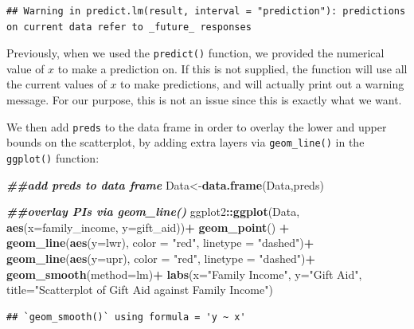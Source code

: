 \documentclass[
]{book}
\newenvironment{Shaded}{\begin{snugshade}}{\end{snugshade}}
\newcommand{\AttributeTok}[1]{\textcolor[rgb]{0.13,0.29,0.53}{#1}}
\newcommand{\DocumentationTok}[1]{\textcolor[rgb]{0.56,0.35,0.01}{\textbf{\textit{#1}}}}
\newcommand{\FunctionTok}[1]{\textcolor[rgb]{0.13,0.29,0.53}{\textbf{#1}}}
\newcommand{\NormalTok}[1]{#1}
\newcommand{\OtherTok}[1]{\textcolor[rgb]{0.56,0.35,0.01}{#1}}
\newcommand{\SpecialCharTok}[1]{\textcolor[rgb]{0.81,0.36,0.00}{\textbf{#1}}}
\newcommand{\StringTok}[1]{\textcolor[rgb]{0.31,0.60,0.02}{#1}}
\begin{document}
\begin{verbatim}
## Warning in predict.lm(result, interval = "prediction"): predictions on current data refer to _future_ responses
\end{verbatim}

Previously, when we used the \texttt{predict()} function, we provided the numerical value of \(x\) to make a prediction on. If this is not supplied, the function will use all the current values of \(x\) to make predictions, and will actually print out a warning message. For our purpose, this is not an issue since this is exactly what we want.

We then add \texttt{preds} to the data frame in order to overlay the lower and upper bounds on the scatterplot, by adding extra layers via \texttt{geom\_line()} in the \texttt{ggplot()} function:

\begin{Shaded}
\begin{Highlighting}[]
\DocumentationTok{\#\#add preds to data frame}
\NormalTok{Data}\OtherTok{\textless{}{-}}\FunctionTok{data.frame}\NormalTok{(Data,preds)}

\DocumentationTok{\#\#overlay PIs via geom\_line()}
\NormalTok{ggplot2}\SpecialCharTok{::}\FunctionTok{ggplot}\NormalTok{(Data, }\FunctionTok{aes}\NormalTok{(}\AttributeTok{x=}\NormalTok{family\_income, }\AttributeTok{y=}\NormalTok{gift\_aid))}\SpecialCharTok{+}
  \FunctionTok{geom\_point}\NormalTok{() }\SpecialCharTok{+}
  \FunctionTok{geom\_line}\NormalTok{(}\FunctionTok{aes}\NormalTok{(}\AttributeTok{y=}\NormalTok{lwr), }\AttributeTok{color =} \StringTok{"red"}\NormalTok{, }\AttributeTok{linetype =} \StringTok{"dashed"}\NormalTok{)}\SpecialCharTok{+}
  \FunctionTok{geom\_line}\NormalTok{(}\FunctionTok{aes}\NormalTok{(}\AttributeTok{y=}\NormalTok{upr), }\AttributeTok{color =} \StringTok{"red"}\NormalTok{, }\AttributeTok{linetype =} \StringTok{"dashed"}\NormalTok{)}\SpecialCharTok{+}
  \FunctionTok{geom\_smooth}\NormalTok{(}\AttributeTok{method=}\NormalTok{lm)}\SpecialCharTok{+}
  \FunctionTok{labs}\NormalTok{(}\AttributeTok{x=}\StringTok{"Family Income"}\NormalTok{, }
       \AttributeTok{y=}\StringTok{"Gift Aid"}\NormalTok{, }
       \AttributeTok{title=}\StringTok{"Scatterplot of Gift Aid against Family Income"}\NormalTok{)}
\end{Highlighting}
\end{Shaded}

\begin{verbatim}
## `geom_smooth()` using formula = 'y ~ x'
\end{verbatim}
\end{document}
